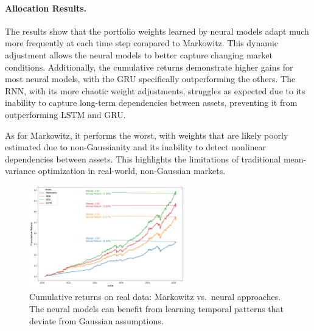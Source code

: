\documentclass[11pt]{article}
\begin{document}
\paragraph{Allocation Results.}
The results show that the portfolio weights learned by neural models adapt much more frequently at each time step compared to Markowitz. This dynamic adjustment allows the neural models to better capture changing market conditions. Additionally, the cumulative returns demonstrate higher gains for most neural models, with the GRU specifically outperforming the others. The RNN, with its more chaotic weight adjustments, struggles as expected due to its inability to capture long-term dependencies between assets, preventing it from outperforming LSTM and GRU.

As for Markowitz, it performs the worst, with weights that are likely poorly estimated due to non-Gaussianity and its inability to detect nonlinear dependencies between assets. This highlights the limitations of traditional mean-variance optimization in real-world, non-Gaussian markets.




\begin{figure}[!h]
    \centering
    \includegraphics[width=0.6\textwidth]{images/cumreturn_real.png}
    \caption{Cumulative returns on real data: Markowitz vs.\ neural approaches. The neural models can benefit from learning temporal patterns that deviate from Gaussian assumptions.}
    \label{fig:realdata_performance}
\end{figure}
\end{document}
